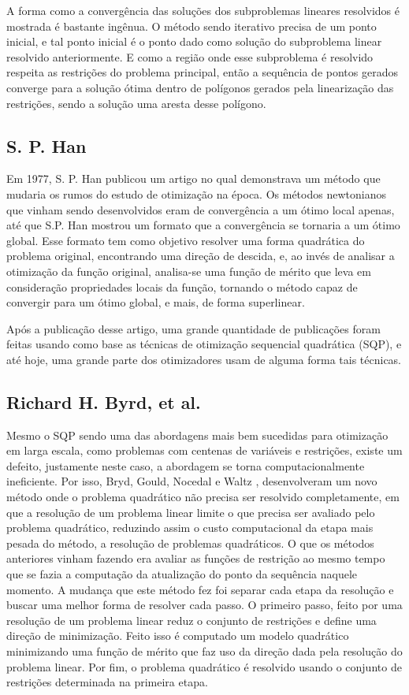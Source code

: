 A forma como a convergência das soluções dos subproblemas lineares resolvidos é mostrada é
bastante ingênua. O método sendo iterativo precisa de um ponto inicial, e tal ponto inicial é o
ponto dado como solução do subproblema linear resolvido anteriormente. E como a região onde esse
subproblema é resolvido respeita as restrições do problema principal, então a sequência de pontos
gerados converge para a solução ótima dentro de polígonos gerados pela linearização das
restrições, sendo a solução uma aresta desse polígono.

\subsection{S. P. Han}
Em 1977, S. P. Han \cite{han1977globally} publicou um artigo no qual demonstrava um método que mudaria
os rumos do estudo de otimização na época. Os métodos newtonianos que vinham sendo desenvolvidos
eram de convergência a um ótimo local apenas, até que S.P. Han mostrou um formato que a convergência
se tornaria a um ótimo global. Esse formato tem como objetivo resolver uma forma quadrática do
problema original, encontrando uma direção de descida, e, ao invés de analisar a otimização da
função original, analisa-se uma função de mérito que leva em consideração propriedades locais da
função, tornando o método capaz de convergir para um ótimo global, e mais, de forma superlinear.

Após a publicação desse artigo, uma grande quantidade de publicações foram feitas usando como
base as técnicas de otimização sequencial quadrática (SQP), e até hoje, uma grande parte dos
otimizadores usam de alguma forma tais técnicas.

\subsection{Richard H. Byrd, et al.}
Mesmo o SQP sendo uma das abordagens mais bem sucedidas para otimização em larga escala, como
problemas com centenas de variáveis e restrições, existe um defeito, justamente neste caso, a
abordagem se torna computacionalmente ineficiente. Por isso, Bryd, Gould, Nocedal e
Waltz \cite{byrd2003algorithm}, desenvolveram um novo método onde o problema quadrático não precisa
ser resolvido completamente, em que a resolução de um problema linear limite o que precisa ser
avaliado pelo problema quadrático, reduzindo assim o custo computacional da etapa mais pesada do
método, a resolução de problemas quadráticos. O que os métodos anteriores vinham fazendo era avaliar
as funções de restrição ao mesmo tempo que se fazia a computação da atualização do ponto da
sequência naquele momento. A mudança que este método fez foi separar cada etapa da resolução e
buscar uma melhor forma de resolver cada passo. O primeiro passo, feito por uma resolução de um
problema linear reduz o conjunto de restrições e define uma direção de minimização. Feito isso é
computado um modelo quadrático minimizando uma função de mérito que faz uso da direção dada pela
resolução do problema linear. Por fim, o problema quadrático é resolvido usando o conjunto de
restrições determinada na primeira etapa.
